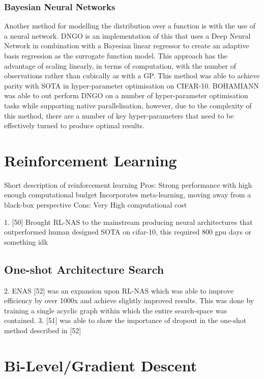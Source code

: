 \documentclass{article}
\begin{document}
\subsubsection{Bayesian Neural Networks}

Another method for modelling the distribution over a function is with the use of a neural network. DNGO \cite{22} is an implementation of this that uses a Deep Neural Network in combination with a Bayesian linear regressor to create an adaptive basis regression as the surrogate function model. This approach has the advantage of scaling linearly, in terms of computation, with the number of observations rather than cubically as with a GP. This method was able to achieve parity with SOTA in hyper-parameter optimisation on CIFAR-10. BOHAMIANN \cite{40} was able to out perform DNGO on a number of hyper-parameter optimisation tasks while supporting native parallelisation, however, due to the complexity of this method, there are a number of key hyper-parameters that need to be effectively turned to produce optimal results.


\section{Reinforcement Learning}

    Short description of reinforcement learning 
    Pros:
        Strong performance with high enough computational budget
        Incorporates meta-learning, moving away from a black-box perspective
    Cons:
        Very High computational cost

    1. [50] Brought RL-NAS to the mainstream producing neural architectures that outperformed human designed SOTA on cifar-10, this required 800 gpu days or something idk
    \subsection{One-shot Architecture Search}
    2. ENAS [52] was an expansion upon RL-NAS which was able to improve efficiency by over 1000x and achieve slightly improved results. This was done by training a single acyclic graph within which the entire search-space was contained. 
    3. [51] was able to show the importance of dropout in the one-shot method described in [52] 

\section{Bi-Level/Gradient Descent}
\end{document}
